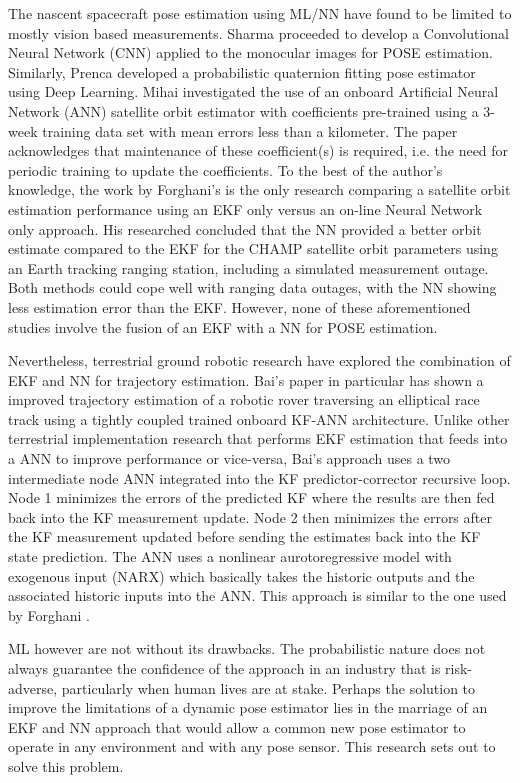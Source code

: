 The nascent spacecraft pose estimation using ML/NN have found to be limited to mostly vision based measurements. Sharma \cite{sharmePoseNonCYYb} proceeded to develop a Convolutional Neural Network (CNN) applied to the monocular images for POSE estimation. Similarly, Prenca \cite{prencaDlPosePhotorealistic19} developed a probabilistic quaternion fitting pose estimator using Deep Learning. Mihai \cite{mihaiPoseAnn20} investigated the use of an onboard Artificial Neural Network (ANN) satellite orbit estimator with coefficients pre-trained using a 3-week training data set with mean errors less than a kilometer. The paper acknowledges that maintenance of these coefficient(s) is required, i.e. the need for periodic training to update the coefficients. To the best of the author's knowledge, the work by Forghani's is the only research comparing a satellite orbit estimation performance using an EKF only versus an on-line Neural Network only approach. His researched concluded that the NN provided a better orbit estimate compared to the EKF for the CHAMP satellite orbit parameters using an Earth tracking ranging station, including a simulated measurement outage. Both methods could cope well with ranging data outages, with the NN showing less estimation error than the EKF. However, none of these aforementioned studies involve the fusion of an EKF with a NN for POSE estimation.

Nevertheless, terrestrial ground robotic research have explored the combination of EKF and NN for trajectory estimation. Bai's \cite{baiKf20} paper in particular has shown a improved trajectory estimation of a robotic rover traversing an elliptical race track using a tightly coupled trained onboard KF-ANN architecture. Unlike other terrestrial implementation research that performs EKF estimation that feeds into a ANN to improve performance or vice-versa, Bai's approach uses a two intermediate node ANN integrated into the KF predictor-corrector recursive loop. Node 1 minimizes the errors of the predicted KF where the results are then fed back into the KF measurement update. Node 2 then minimizes the errors after the KF measurement updated before sending the estimates back into the KF state prediction. The ANN uses a nonlinear aurotoregressive model with exogenous input (NARX) which basically takes the historic outputs and the associated historic inputs into the ANN. This approach is similar to the one used by Forghani \cite{}.     

ML however are not without its drawbacks. The probabilistic nature does not always guarantee the confidence of the approach in an industry that is risk-adverse, particularly when human lives are at stake.  Perhaps the solution to improve the limitations of a dynamic pose estimator lies in the marriage of an EKF and NN approach that would allow a common new pose estimator to operate in any environment and with any pose sensor. This research sets out to solve this problem. 
 
